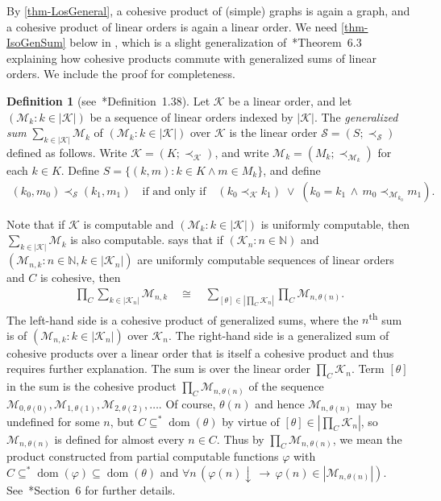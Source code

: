 \documentclass[11pt,a4paper,reqno]{amsart}
\theoremstyle{definition}
\newtheorem{Definition}[Theorem]{Definition}
\DeclareMathOperator{\dom}{\mathrm{dom}}
\newcommand{\da}{{\downarrow}}
\newcommand{\imp}{\rightarrow}
\newcommand{\iso}{\cong}
\newcommand{\Nb}{\mathbb{N}}
\newcommand{\mc}[1]{\mathcal{#1}}
\begin{document}
By \cref{thm-LosGeneral}, a cohesive product of (simple) graphs is again a graph, and a cohesive product of linear orders is again a linear order.  We need \cref{thm-IsoGenSum} below in , which is a slight generalization of~\cite{CohPowJournal}*{Theorem~6.3} explaining how cohesive products commute with generalized sums of linear orders.  We include the proof for completeness.

\begin{Definition}[see~\cite{RosBook}*{Definition~1.38}]\label{def-GenSum}
Let $\mc{K}$ be a linear order, and let $(\mc{M}_k : k \in |\mc{K}|)$ be a sequence of linear orders indexed by $|\mc{K}|$.  The \emph{generalized sum} $\sum_{k \in |\mc{K}|}\mc{M}_k$ of $(\mc{M}_k : k \in |\mc{K}|)$ over $\mc{K}$ is the linear order $\mc{S} = (S; \prec_\mc{S})$ defined as follows.  Write $\mc{K} = (K; \prec_\mc{K})$, and write $\mc{M}_k = (M_k; \prec_{\mc{M}_k})$ for each $k \in K$.  Define $S = \{(k, m) : k \in K \land m \in M_k\}$, and define
\begin{align*}
(k_0, m_0) \prec_{\mc{S}} (k_1, m_1) \quad\text{if and only if}\quad (k_0 \prec_\mc{K} k_1) \;\lor\; (k_0 = k_1 \,\land\, m_0 \prec_{\mc{M}_{k_0}} m_1).
\end{align*}
\end{Definition}

Note that if $\mc{K}$ is computable and $(\mc{M}_k : k \in |\mc{K}|)$ is uniformly computable, then $\sum_{k \in |\mc{K}|}\mc{M}_k$ is also computable.   says that if $(\mc{K}_n : n \in \Nb)$ and $(\mc{M}_{n,k} : n \in \Nb, k \in |\mc{K}_n|)$ are uniformly computable sequences of linear orders and $C$ is cohesive, then
\begin{align*}
\prod\nolimits_C \sum_{k \in |\mc{K}_n|}\mc{M}_{n,k} \quad\iso\quad \sum_{[\theta] \in \left|\prod_C \mc{K}_n\right|}\prod\nolimits_C \mc{M}_{n,\theta(n)}.
\end{align*}
The left-hand side is a cohesive product of generalized sums, where the $n$\textsuperscript{th} sum is of $(\mc{M}_{n,k} : k \in |\mc{K}_n|)$ over $\mc{K}_n$.  The right-hand side is a generalized sum of cohesive products over a linear order that is itself a cohesive product and thus requires further explanation.  The sum is over the linear order $\prod_C \mc{K}_n$.  Term $[\theta]$ in the sum is the cohesive product $\prod_C \mc{M}_{n,\theta(n)}$ of the sequence $\mc{M}_{0,\theta(0)}, \mc{M}_{1,\theta(1)}, \mc{M}_{2,\theta(2)}, \dots$.  Of course, $\theta(n)$ and hence $\mc{M}_{n,\theta(n)}$ may be undefined for some $n$, but $C \subseteq^* \dom(\theta)$ by virtue of $[\theta] \in \left|\prod_C \mc{K}_n\right|$, so $\mc{M}_{n,\theta(n)}$ is defined for almost every $n \in C$.  Thus by $\prod_C \mc{M}_{n,\theta(n)}$, we mean the product constructed from partial computable functions $\varphi$ with $C \subseteq^* \dom(\varphi) \subseteq \dom(\theta)$ and $\forall n\, (\varphi(n)\da \,\imp\, \varphi(n) \in |\mc{M}_{n,\theta(n)}|)$.  See~\cite{CohPowJournal}*{Section~6} for further details.
\end{document}
